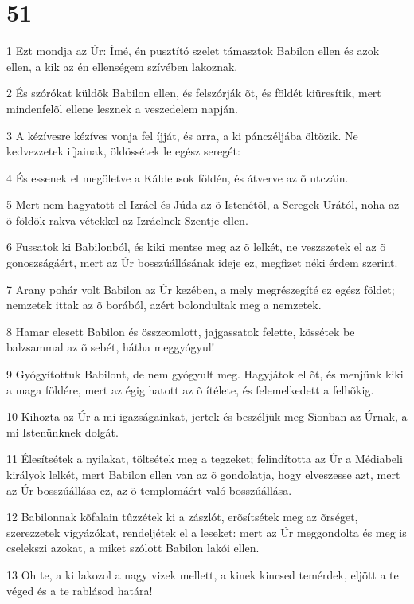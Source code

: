 \chapter{51}

\par 1 Ezt mondja az Úr: Ímé, én pusztító szelet támasztok Babilon ellen és azok ellen, a kik az én ellenségem szívében lakoznak.
\par 2 És szórókat küldök Babilon ellen, és felszórják õt, és földét kiüresítik, mert mindenfelõl ellene lesznek a veszedelem napján.
\par 3 A kézívesre kézíves vonja fel íjját, és arra, a ki pánczéljába öltözik. Ne kedvezzetek ifjainak, öldössétek le egész seregét:
\par 4 És essenek el megöletve a Káldeusok földén, és átverve az õ utczáin.
\par 5 Mert nem hagyatott el Izráel és Júda az õ Istenétõl, a Seregek Urától, noha az õ földök rakva vétekkel az Izráelnek Szentje ellen.
\par 6 Fussatok ki Babilonból, és kiki mentse meg az õ lelkét, ne veszszetek el az õ gonoszságáért, mert az Úr bosszúállásának ideje ez, megfizet néki érdem szerint.
\par 7 Arany pohár volt Babilon az Úr kezében, a mely megrészegíté ez egész földet; nemzetek ittak az õ borából, azért bolondultak meg a nemzetek.
\par 8 Hamar elesett Babilon és összeomlott, jajgassatok felette, kössétek be balzsammal  az õ sebét, hátha meggyógyul!
\par 9 Gyógyítottuk Babilont, de nem gyógyult meg. Hagyjátok el õt, és menjünk kiki a maga földére, mert az égig hatott az õ ítélete, és felemelkedett a felhõkig.
\par 10 Kihozta az Úr a mi igazságainkat, jertek és beszéljük meg Sionban az Úrnak, a mi Istenünknek dolgát.
\par 11 Élesítsétek a nyilakat, töltsétek meg a tegzeket; felindította az Úr a Médiabeli királyok lelkét, mert Babilon ellen van az õ gondolatja, hogy elveszesse azt, mert az Úr bosszúállása ez, az õ templomáért való bosszúállása.
\par 12 Babilonnak kõfalain tûzzétek ki a zászlót, erõsítsétek meg az õrséget, szerezzetek vigyázókat, rendeljétek el a leseket: mert az Úr meggondolta és meg is cselekszi azokat, a miket szólott Babilon lakói ellen.
\par 13 Oh te, a ki lakozol a nagy vizek mellett, a kinek kincsed temérdek, eljött a te véged és a te rablásod határa!
